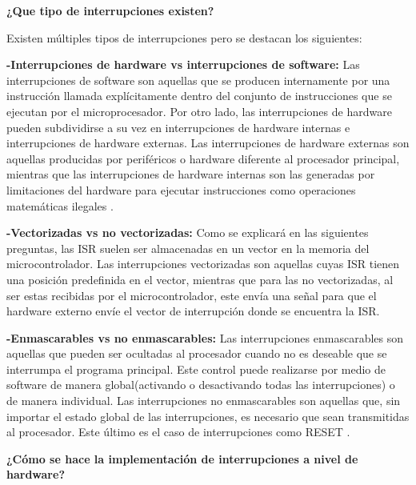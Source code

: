 \documentclass[a4paper,11pt]{article}
\begin{document}
{\large\bfseries ¿Que tipo de interrupciones existen? }

Existen múltiples tipos de interrupciones pero se destacan los siguientes:

{\large\bfseries -Interrupciones de hardware vs interrupciones de software:}
Las interrupciones de software son aquellas que se producen internamente por una instrucción llamada explícitamente dentro del conjunto de instrucciones que se ejecutan por el microprocesador. Por otro lado, las interrupciones de hardware pueden subdividirse a su vez en interrupciones de hardware internas e interrupciones de hardware externas. Las interrupciones de hardware externas son aquellas producidas por periféricos o hardware diferente al procesador principal, mientras que las interrupciones de hardware internas son las generadas por limitaciones del hardware para ejecutar instrucciones como operaciones matemáticas ilegales \cite{labrosse2008embedded}.

{\large\bfseries -Vectorizadas vs no vectorizadas: }
Como se explicará en las siguientes preguntas, las ISR suelen ser almacenadas en un vector en la memoria del microcontrolador. Las interrupciones vectorizadas son aquellas cuyas ISR tienen una posición predefinida en el vector, mientras que para las no vectorizadas, al ser estas recibidas por el microcontrolador, este envía una señal para que el hardware externo envíe el vector de interrupción donde se encuentra la ISR. \cite[p.195]{udayashankara2009microcontroller}

{\large \bfseries -Enmascarables vs no enmascarables: }
Las interrupciones enmascarables son aquellas que pueden ser ocultadas al procesador cuando no es deseable que se interrumpa el programa principal. Este control puede realizarse por medio de software de manera global(activando o desactivando todas las interrupciones) o de manera individual. Las interrupciones no enmascarables son aquellas que, sin importar el estado global de las interrupciones, es necesario que sean transmitidas al procesador. Este último es el caso de interrupciones como RESET \cite[p.11]{susnea2005microcontrollers}.

{\large\bfseries ¿Cómo se hace la implementación de interrupciones a nivel de hardware? } 
\end{document}
